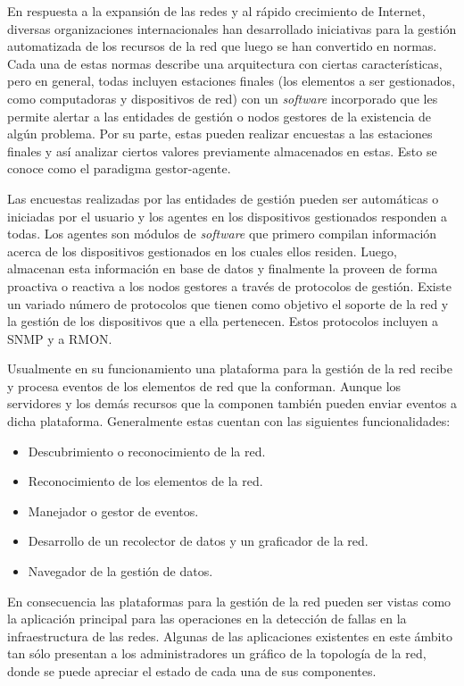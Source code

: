 En respuesta a la expansión de las redes y al rápido crecimiento de Internet,
diversas organizaciones internacionales han desarrollado iniciativas para la
gestión automatizada de los recursos de la red que luego se han convertido en
normas\cite{Exposito2003}. Cada una de estas normas describe una arquitectura
con ciertas características, pero en general, todas incluyen estaciones finales
(los elementos a ser gestionados, como computadoras y dispositivos de red) con
un \textit{software} incorporado que les permite alertar a las entidades de
gestión o nodos gestores de la existencia de algún problema. Por su parte, estas
pueden realizar encuestas a las estaciones finales y así analizar ciertos
valores previamente almacenados en estas. Esto se conoce como el paradigma
gestor-agente. %

Las encuestas realizadas por las entidades de gestión pueden ser automáticas o
iniciadas por el usuario y los agentes en los dispositivos gestionados responden
a todas. Los agentes son módulos de \textit{software} que primero compilan
información acerca de los dispositivos gestionados en los cuales ellos residen.
Luego, almacenan esta información en base de datos y finalmente la proveen de
forma proactiva o reactiva a los nodos gestores a través de protocolos de
gestión. Existe un variado número de protocolos que tienen como objetivo el
soporte de la red y la gestión de los dispositivos que a ella pertenecen. Estos
protocolos incluyen a SNMP\cite{Hardaker2011} y a RMON\cite{Fenner2005}.

Usualmente en su funcionamiento una plataforma para la gestión de la red recibe
y procesa eventos de los elementos de red que la conforman. Aunque los
servidores y los demás recursos que la componen también pueden enviar eventos a
dicha plataforma. Generalmente estas cuentan con las siguientes funcionalidades:
\begin{itemize}
 \item Descubrimiento o reconocimiento de la red.
 \item Reconocimiento de los elementos de la red.
 \item Manejador o gestor de eventos.
 \item Desarrollo de un recolector de datos y un graficador de la red.
 \item Navegador de la gestión de datos.
\end{itemize}

En consecuencia las plataformas para la gestión de la red pueden ser vistas como
la aplicación principal para las operaciones en la detección de fallas en
la infraestructura de las redes. Algunas de las aplicaciones existentes en este ámbito tan
sólo presentan a los administradores un gráfico de la topología de la red, donde
se puede apreciar el estado de cada una de sus componentes. 

